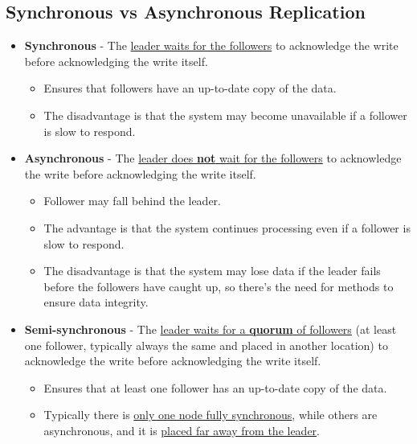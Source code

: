 \subsection{Synchronous vs Asynchronous Replication}
\begin{itemize}
   \item \textbf{Synchronous} - The \ul{leader waits for the followers} to acknowledge the write before acknowledging the write itself.
   \begin{itemize}
      \item Ensures that followers have an up-to-date copy of the data.
      \item The disadvantage is that the system may become unavailable if a follower is slow to respond.
   \end{itemize}
   \item \textbf{Asynchronous} - The \ul{leader does \textbf{not} wait for the followers} to acknowledge the write before acknowledging the write itself.
   \begin{itemize}
      \item Follower may fall behind the leader.
      \item The advantage is that the system continues processing even if a follower is slow to respond.
      \item The disadvantage is that the system may lose data if the leader fails before the followers have caught up, so there's the need for methods to ensure data integrity.
   \end{itemize}
   \item \textbf{Semi-synchronous} - The \ul{leader waits for a \textbf{quorum} of followers} (at least one follower, typically always the same and placed in another location) to acknowledge the write before acknowledging the write itself.
   \begin{itemize}
      \item Ensures that at least one follower has an up-to-date copy of the data.
      \item Typically there is \ul{only one node fully synchronous}, while others are asynchronous, and it is \ul{placed far away from the leader}.
   \end{itemize}
\end{itemize}

